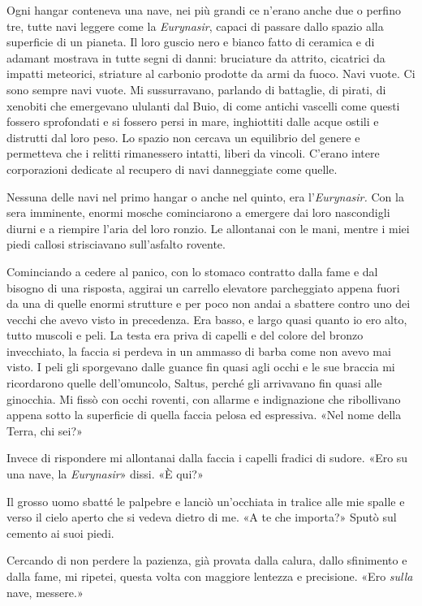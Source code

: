 Ogni hangar conteneva una nave, nei più grandi ce n'erano anche due o
perfino tre, tutte navi leggere come la \emph{Eurynasir}, capaci di
passare dallo spazio alla superficie di un pianeta. Il loro guscio nero
e bianco fatto di ceramica e di adamant mostrava in tutte segni di
danni: bruciature da attrito, cicatrici da impatti meteorici, striature
al carbonio prodotte da armi da fuoco. Navi vuote. Ci sono sempre navi
vuote. Mi sussurravano, parlando di battaglie, di pirati, di xenobiti
che emergevano ululanti dal Buio, di come antichi vascelli come questi
fossero sprofondati e si fossero persi in mare, inghiottiti dalle acque
ostili e distrutti dal loro peso. Lo spazio non cercava un equilibrio
del genere e permetteva che i relitti rimanessero intatti, liberi da
vincoli. C'erano intere corporazioni dedicate al recupero di navi
danneggiate come quelle.

Nessuna delle navi nel primo hangar o anche nel quinto, era
l'\emph{Eurynasir.} Con la sera imminente, enormi mosche cominciarono a
emergere dai loro nascondigli diurni e a riempire l'aria del loro
ronzio. Le allontanai con le mani, mentre i miei piedi callosi
strisciavano sull'asfalto rovente.

Cominciando a cedere al panico, con lo stomaco contratto dalla fame e
dal bisogno di una risposta, aggirai un carrello elevatore parcheggiato
appena fuori da una di quelle enormi strutture e per poco non andai a
sbattere contro uno dei vecchi che avevo visto in precedenza. Era basso,
e largo quasi quanto io ero alto, tutto muscoli e peli. La testa era
priva di capelli e del colore del bronzo invecchiato, la faccia si
perdeva in un ammasso di barba come non avevo mai visto. I peli gli
sporgevano dalle guance fin quasi agli occhi e le sue braccia mi
ricordarono quelle dell'omuncolo, Saltus, perché gli arrivavano fin
quasi alle ginocchia. Mi fissò con occhi roventi, con allarme e
indignazione che ribollivano appena sotto la superficie di quella faccia
pelosa ed espressiva. «Nel nome della Terra, chi sei?»

Invece di rispondere mi allontanai dalla faccia i capelli fradici di
sudore. «Ero su una nave, la \emph{Eurynasir}» dissi. «È qui?»

Il grosso uomo sbatté le palpebre e lanciò un'occhiata in tralice alle
mie spalle e verso il cielo aperto che si vedeva dietro di me. «A te che
importa?» Sputò sul cemento ai suoi piedi.

Cercando di non perdere la pazienza, già provata dalla calura, dallo
sfinimento e dalla fame, mi ripetei, questa volta con maggiore lentezza
e precisione. «Ero \emph{sulla} nave, messere.»

